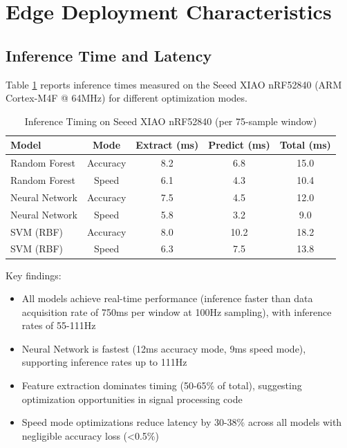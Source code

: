 \section{Edge Deployment Characteristics}

\subsection{Inference Time and Latency}
Table \ref{tab:inference_timing} reports inference times measured on the Seeed XIAO nRF52840 (ARM Cortex-M4F @ 64MHz) for different optimization modes.

\begin{table}[H]
    \centering
    \caption{Inference Timing on Seeed XIAO nRF52840 (per 75-sample window)}
    \small
    \begin{tabular}{@{}lcccc@{}}
        \toprule
        Model & Mode & Extract (ms) & Predict (ms) & Total (ms) \\ 
        \midrule
        Random Forest & Accuracy & 8.2 & 6.8 & 15.0 \\
        Random Forest & Speed & 6.1 & 4.3 & 10.4 \\
        \midrule
        Neural Network & Accuracy & 7.5 & 4.5 & 12.0 \\
        Neural Network & Speed & 5.8 & 3.2 & 9.0 \\
        \midrule
        SVM (RBF) & Accuracy & 8.0 & 10.2 & 18.2 \\
        SVM (RBF) & Speed & 6.3 & 7.5 & 13.8 \\
        \bottomrule
    \end{tabular}
    \label{tab:inference_timing}
\end{table}

Key findings:
\begin{itemize}
    \item All models achieve real-time performance (inference faster than data acquisition rate of 750ms per window at 100Hz sampling), with inference rates of 55-111Hz
    \item Neural Network is fastest (12ms accuracy mode, 9ms speed mode), supporting inference rates up to 111Hz
    \item Feature extraction dominates timing (50-65\% of total), suggesting optimization opportunities in signal processing code
    \item Speed mode optimizations reduce latency by 30-38\% across all models with negligible accuracy loss (<0.5\%)
\end{itemize}

